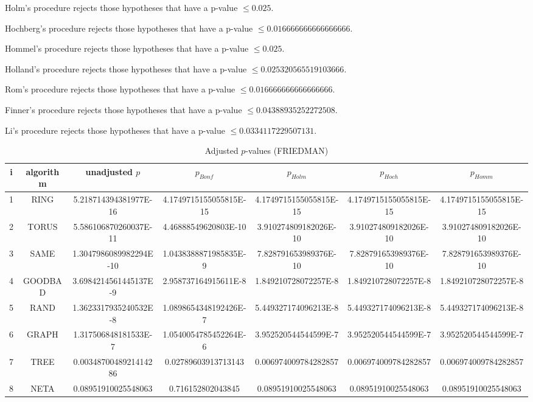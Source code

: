 \documentclass[a4paper,10pt]{article}
\begin{document}
\begin{landscape}
Holm's procedure rejects those hypotheses that have a p-value $\le0.025$.


Hochberg's procedure rejects those hypotheses that have a p-value $\le0.016666666666666666$.


Hommel's procedure rejects those hypotheses that have a p-value $\le0.025$.


Holland's procedure rejects those hypotheses that have a p-value $\le0.025320565519103666$.


Rom's procedure rejects those hypotheses that have a p-value $\le0.016666666666666666$.


Finner's procedure rejects those hypotheses that have a p-value $\le0.04388935252272508$.


Li's procedure rejects those hypotheses that have a p-value $\le0.0334117229507131$.



\newpage

\begin{table}[!htp]
\centering\scriptsize
\caption{Adjusted $p$-values (FRIEDMAN)}
\begin{tabular}{ccccccc}
i&algorithm&unadjusted $p$&$p_{Bonf}$&$p_{Holm}$&$p_{Hoch}$&$p_{Homm}$\\
\hline
1& RING&5.218714394381977E-16&4.1749715155055815E-15&4.1749715155055815E-15&4.1749715155055815E-15&4.1749715155055815E-15\\
2& TORUS&5.586106870260037E-11&4.46888549620803E-10&3.910274809182026E-10&3.910274809182026E-10&3.910274809182026E-10\\
3& SAME&1.3047986089982294E-10&1.0438388871985835E-9&7.828791653989376E-10&7.828791653989376E-10&7.828791653989376E-10\\
4& GOODBAD&3.6984214561445137E-9&2.958737164915611E-8&1.849210728072257E-8&1.849210728072257E-8&1.849210728072257E-8\\
5& RAND&1.3623317935240532E-8&1.0898654348192426E-7&5.449327174096213E-8&5.449327174096213E-8&5.449327174096213E-8\\
6& GRAPH&1.317506848181533E-7&1.0540054785452264E-6&3.952520544544599E-7&3.952520544544599E-7&3.952520544544599E-7\\
7& TREE&0.0034870048921414286&0.02789603913713143&0.006974009784282857&0.006974009784282857&0.006974009784282857\\
8& NETA&0.08951910025548063&0.716152802043845&0.08951910025548063&0.08951910025548063&0.08951910025548063\\
\hline
\end{tabular}
\end{table}


\end{landscape}
\end{document}
